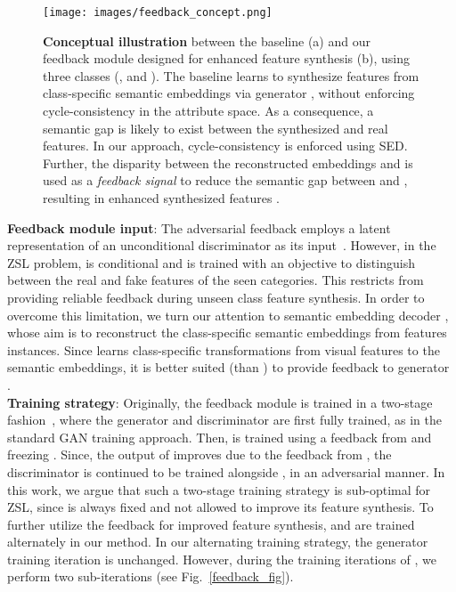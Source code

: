\documentclass[runningheads]{llncs}
\begin{document}
\begin{wrapfigure}{R}{0.5\columnwidth}
\centering
\texttt{[image: images/feedback\_concept.png]}
\caption{\label{new_feedback_fig} \textbf{Conceptual illustration} between the baseline (a) and our feedback module designed for enhanced feature synthesis (b), using three classes (,  and ). The baseline learns to synthesize features  from class-specific semantic embeddings  via generator , without enforcing cycle-consistency in the attribute space. As a consequence, a semantic gap is likely to exist between the synthesized and real  features. In our approach, cycle-consistency is enforced using SED. Further, the disparity between the reconstructed embeddings  and  is used as a \textit{feedback signal} to reduce the semantic gap between  and , resulting in enhanced synthesized features .}
\end{wrapfigure}
\noindent \textbf{Feedback module input}: The adversarial feedback employs a latent representation of an unconditional discriminator  as its input~\cite{shama19iccv}.
However, in the ZSL problem,  is conditional and is trained with an objective to distinguish between the real and fake features of the seen categories. This restricts  from providing reliable feedback during unseen class feature synthesis. In order to overcome this limitation, we turn our attention to semantic embedding decoder , whose aim is to reconstruct the class-specific semantic embeddings from features instances. Since  learns class-specific transformations from visual features to the semantic embeddings, it is better suited (than ) to provide feedback to generator . \\
\noindent \textbf{Training strategy}: Originally, the feedback module  is trained in a two-stage fashion~\cite{shama19iccv}, where the generator  and discriminator  are first fully trained, as in the standard GAN training approach. Then,  is trained using a feedback from  and freezing . Since, the output of  improves due to the feedback from , the discriminator  is continued to be trained alongside , in an adversarial manner. In this work, we argue that such a two-stage training strategy is sub-optimal for ZSL, since  is always fixed and not allowed to improve its feature synthesis. To further utilize the feedback for improved feature synthesis,  and  are trained alternately in our method. In our alternating training strategy, the generator training iteration is unchanged. However, during the training iterations of , we perform two sub-iterations (see Fig.~\ref{feedback_fig}). 
\end{document}

